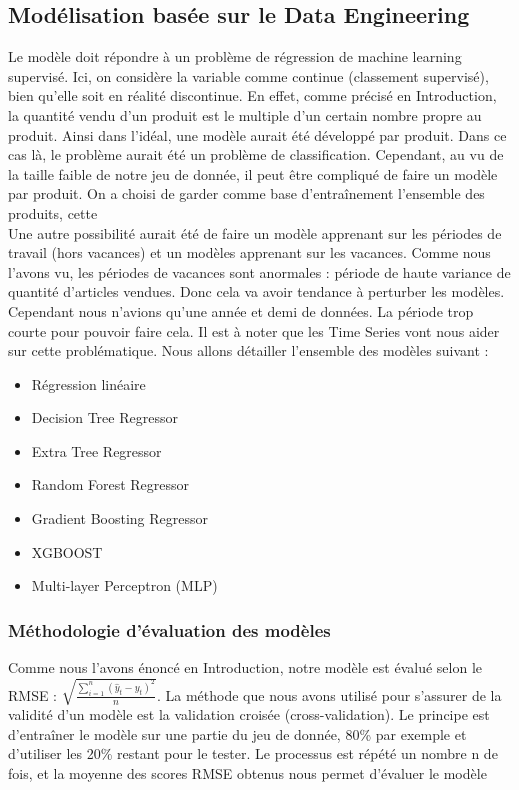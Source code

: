 \documentclass{article} %
\begin{document}
\subsection{Modélisation basée sur le Data Engineering}
Le modèle doit répondre à un problème de régression de machine learning supervisé. Ici, on considère la variable comme continue (classement supervisé), bien qu'elle soit en réalité discontinue. En effet, comme précisé en Introduction, la quantité vendu d'un produit est le multiple d'un certain nombre propre au produit. Ainsi dans l'idéal, une modèle aurait été développé par produit. Dans ce cas là, le problème aurait été un problème de classification. Cependant, au vu de la taille faible de notre jeu de donnée, il peut être compliqué de faire un modèle par produit. On a choisi de garder comme base d'entraînement l'ensemble des produits, cette\\
Une autre possibilité aurait été de faire un modèle apprenant sur les périodes de travail (hors vacances) et un modèles apprenant sur les vacances. Comme nous l'avons vu, les périodes de vacances sont anormales : période de haute variance de quantité d'articles vendues. Donc cela va avoir tendance à perturber les modèles. Cependant nous n'avions qu'une année et demi de données. La période trop courte pour pouvoir faire cela. Il est à noter que les Time Series vont nous aider sur cette problématique. 
Nous allons détailler l'ensemble des modèles suivant :
\begin{itemize}
	\item Régression linéaire
	\item Decision Tree Regressor
	\item Extra Tree Regressor
	\item Random Forest Regressor
	\item Gradient Boosting Regressor
	\item XGBOOST
	\item Multi-layer Perceptron (MLP)
\end{itemize}

\subsubsection{Méthodologie d'évaluation des modèles}
Comme nous l'avons énoncé en Introduction, notre modèle est évalué selon le RMSE : 
$\sqrt{\frac{\sum_{i=1}^{n}(\hat{y}_t-y_t)^2}{n}}$. La méthode que nous avons utilisé pour s'assurer de la validité d'un modèle est la validation croisée (cross-validation). Le principe est d'entraîner le modèle sur une partie du jeu de donnée, 80\% par exemple et d'utiliser les 20\% restant pour le tester. Le processus est répété un nombre n de fois, et la moyenne des scores RMSE obtenus nous permet d'évaluer le modèle
\end{document}
